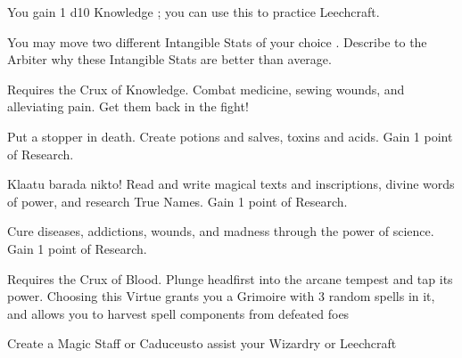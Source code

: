 {  You gain 1 d10 Knowledge \STATIC; you can use this \STATIC to practice Leechcraft.\footnotemark[\value{footnote}]


    You may move two different Intangible Stats of your choice \DCUP.  Describe to the Arbiter why these Intangible Stats are better than average.


  Requires the Crux of Knowledge.  Combat medicine, sewing wounds, and alleviating pain.  Get them back in the fight!
 

  Put a stopper in death.  Create potions and salves, toxins and acids. Gain 1 point of Research.\footnotemark[\value{footnote}]

  
  Klaatu barada nikto! Read and write magical texts and inscriptions, divine words of power, and research True Names. Gain 1 point of Research.\footnotemark[\value{footnote}]


  Cure diseases, addictions, wounds, and madness through the power of science. Gain 1 point of Research.\footnotemark[\value{footnote}]

 

  Requires the Crux of Blood. Plunge headfirst into the arcane tempest and tap its power.  Choosing this Virtue grants you a Grimoire with 3 random spells in it, and allows you to harvest spell components from defeated foes\footnotemark[\value{footnote}]


    Create a Magic Staff or Caduceus\footnotemark[\value{footnote}] to assist your Wizardry or Leechcraft


  \setcounter{footnote}{0}



}
